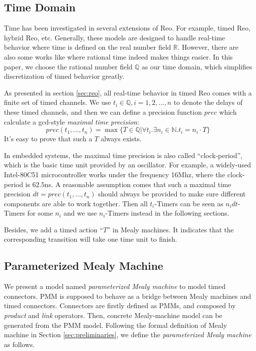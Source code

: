 \documentclass[conference, a4paper]{IEEEtran}
\begin{document}
\subsection{Time Domain}
Time has been investigated in several extensions of Reo. For example, timed
Reo\cite{DBLP:conf/sefm/ArbabBBR04, DBLP:conf/fmoods/MengA07}, hybrid Reo\cite{DBLP:conf/icfem/ChenSS14}, etc.
Generally, these models are designed to handle real-time behavior where time is defined on the
real number field $\mathbb{R}$. However, there are also some works like
\cite{DBLP:journals/fmsd/PrabhakarDM015} where
rational time indeed  makes things easier. In this paper, we choose the rational number field
$\mathbb{Q}$ as our time domain, which simplifies discretization of timed behavior greatly.

As presented in section \ref{sec:reo}, all real-time behavior in timed Reo comes with a finite set
of timed channels. We use
$t_i\in\mathbb{Q}, i=1,2,\dots,n$ to denote the delays of these timed channels, and then we can define a precision
function $prec$ which calculate a gcd-style \emph{maximal time precision}:
\[
prec(t_1,\dots,t_n) = \max\{T\in\mathbb{Q}|\forall t_i.\exists n_i\in\mathbb{N}.t_i=n_i\cdot T\}
\]
It's easy to prove that such a $T$ always exists.

In embedded systems, the maximal time precision is also called ``clock-period'', which is the basic
time unit provided by an oscillator. For example, a widely-used Intel-80C51 microcontroller works
under the frequency 16Mhz, where the clock-period is $62.5$ns. A reasonable assumption comes that
such a maximal time precision $dt=prec(t_1,\dots,t_n)$ should always be provided to make sure
different components are able to work together. Then all $t_i$-Timers can be seen as $n_idt$-Timers
for some $n_i$ and we use $n_i$-Timers instead in the following sections.

Besides, we add a timed action ``$T$'' in Mealy machines. It indicates that the corresponding
transition will take one time unit to finish.

\subsection{Parameterized Mealy Machine}
We present a model named \emph{parameterized Mealy machine} to model timed connectors. PMM is
supposed to behave as a bridge between Mealy machines and timed connectors. Connectors are firstly
defined as PMMs, and composed by \emph{product} and \emph{link} operators. Then, concrete
Mealy-machine model can be generated from the PMM model.
Following the formal definition of Mealy machine in Section \ref{sec:preliminaries}, we define the
\emph{parameterized Mealy machine} as follows. 
\end{document}
